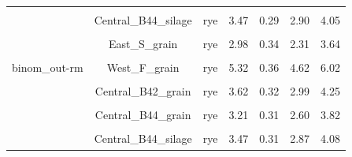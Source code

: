\documentclass[
]{article}
\begin{document}
\begin{table}[H]
\begin{tabular}[t]{ccccccc}
\cellcolor{gray!6}{binom\_out-rm} & \cellcolor{gray!6}{Central\_B44\_silage} & \cellcolor{gray!6}{no} & \cellcolor{gray!6}{4.49} & \cellcolor{gray!6}{0.29} & \cellcolor{gray!6}{3.92} & \cellcolor{gray!6}{5.05}\\
 & \multirow{-2}{*}{\centering\arraybackslash Central\_B44\_silage} & rye & 3.47 & 0.29 & 2.90 & 4.05\\

\cellcolor{gray!6}{binom\_out-rm} & \cellcolor{gray!6}{East\_S\_grain} & \cellcolor{gray!6}{no} & \cellcolor{gray!6}{3.42} & \cellcolor{gray!6}{0.34} & \cellcolor{gray!6}{2.76} & \cellcolor{gray!6}{4.08}\\
 & \multirow{-2}{*}{\centering\arraybackslash East\_S\_grain} & rye & 2.98 & 0.34 & 2.31 & 3.64\\

\cellcolor{gray!6}{binom\_out-rm} & \cellcolor{gray!6}{West\_F\_grain} & \cellcolor{gray!6}{no} & \cellcolor{gray!6}{6.03} & \cellcolor{gray!6}{0.32} & \cellcolor{gray!6}{5.41} & \cellcolor{gray!6}{6.64}\\
\multirow{-10}{*}{\centering\arraybackslash binom\_out-rm} & \multirow{-2}{*}{\centering\arraybackslash West\_F\_grain} & rye & 5.32 & 0.36 & 4.62 & 6.02\\
\cmidrule{1-7}
\cellcolor{gray!6}{binom\_full} & \cellcolor{gray!6}{Central\_B42\_grain} & \cellcolor{gray!6}{no} & \cellcolor{gray!6}{2.65} & \cellcolor{gray!6}{0.32} & \cellcolor{gray!6}{2.01} & \cellcolor{gray!6}{3.28}\\
 & \multirow{-2}{*}{\centering\arraybackslash Central\_B42\_grain} & rye & 3.62 & 0.32 & 2.99 & 4.25\\

\cellcolor{gray!6}{binom\_full} & \cellcolor{gray!6}{Central\_B44\_grain} & \cellcolor{gray!6}{no} & \cellcolor{gray!6}{3.45} & \cellcolor{gray!6}{0.31} & \cellcolor{gray!6}{2.84} & \cellcolor{gray!6}{4.06}\\
 & \multirow{-2}{*}{\centering\arraybackslash Central\_B44\_grain} & rye & 3.21 & 0.31 & 2.60 & 3.82\\

\cellcolor{gray!6}{binom\_full} & \cellcolor{gray!6}{Central\_B44\_silage} & \cellcolor{gray!6}{no} & \cellcolor{gray!6}{4.49} & \cellcolor{gray!6}{0.31} & \cellcolor{gray!6}{3.89} & \cellcolor{gray!6}{5.09}\\
 & \multirow{-2}{*}{\centering\arraybackslash Central\_B44\_silage} & rye & 3.47 & 0.31 & 2.87 & 4.08\\


\end{tabular}
\end{table}
\end{document}
